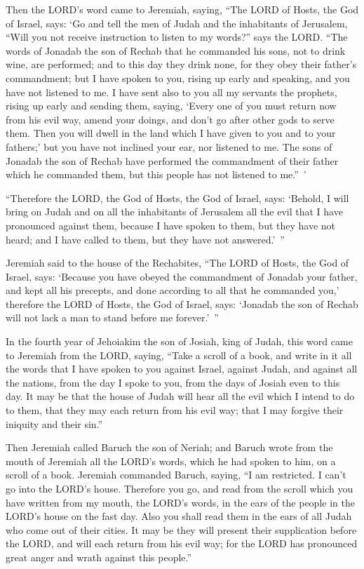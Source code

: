 \myverse{}Then the LORD’s word came to Jeremiah, saying, \myverse{}“The LORD of Hosts, the God of Israel, says: ‘Go and tell the men of Judah and the inhabitants of Jerusalem, “Will you not receive instruction to listen to my words?” says the LORD. \myverse{}“The words of Jonadab the son of Rechab that he commanded his sons, not to drink wine, are performed; and to this day they drink none, for they obey their father’s commandment; but I have spoken to you, rising up early and speaking, and you have not listened to me. \myverse{}I have sent also to you all my servants the prophets, rising up early and sending them, saying, ‘Every one of you must return now from his evil way, amend your doings, and don’t go after other gods to serve them. Then you will dwell in the land which I have given to you and to your fathers;’ but you have not inclined your ear, nor listened to me. \myverse{}The sons of Jonadab the son of Rechab have performed the commandment of their father which he commanded them, but this people has not listened to me.” ’

\myverse{}“Therefore the LORD, the God of Hosts, the God of Israel, says: ‘Behold, I will bring on Judah and on all the inhabitants of Jerusalem all the evil that I have pronounced against them, because I have spoken to them, but they have not heard; and I have called to them, but they have not answered.’ ”

 \myverse{}Jeremiah said to the house of the Rechabites, “The LORD of Hosts, the God of Israel, says: ‘Because you have obeyed the commandment of Jonadab your father, and kept all his precepts, and done according to all that he commanded you,’ \myverse{}therefore the LORD of Hosts, the God of Israel, says: ‘Jonadab the son of Rechab will not lack a man to stand before me forever.’ ”

\mychapter{} \myverse*{}In the fourth year of Jehoiakim the son of Josiah, king of Judah, this word came to Jeremiah from the LORD, saying, \myverse{}“Take a scroll of a book, and write in it all the words that I have spoken to you against Israel, against Judah, and against all the nations, from the day I spoke to you, from the days of Josiah even to this day. \myverse{}It may be that the house of Judah will hear all the evil which I intend to do to them, that they may each return from his evil way; that I may forgive their iniquity and their sin.”


\myverse{}Then Jeremiah called Baruch the son of Neriah; and Baruch wrote from the mouth of Jeremiah all the LORD’s words, which he had spoken to him, on a scroll of a book. \myverse{}Jeremiah commanded Baruch, saying, “I am restricted. I can’t go into the LORD’s house. \myverse{}Therefore you go, and read from the scroll which you have written from my mouth, the LORD’s words, in the ears of the people in the LORD’s house on the fast day. Also you shall read them in the ears of all Judah who come out of their cities. \myverse{}It may be they will present their supplication before the LORD, and will each return from his evil way; for the LORD has pronounced great anger and wrath against this people.”


